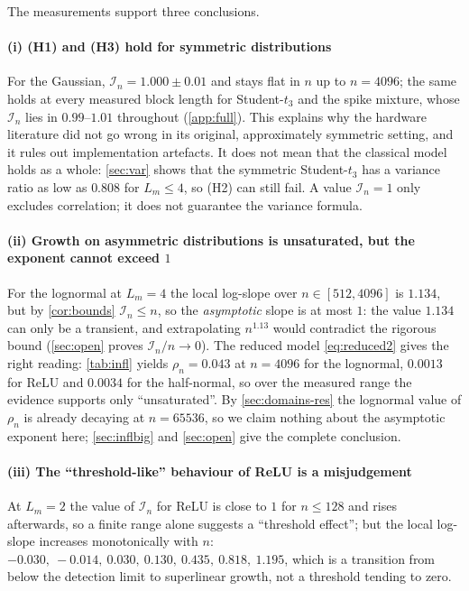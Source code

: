 \documentclass[twocolumn,review,hidelinks,oneeqnum,onetabnum,onefignum,onethmnum]{siamart251216}
\begin{document}
The measurements support three conclusions.

\paragraph{(i) (H1) and (H3) hold for symmetric distributions} For the Gaussian,
$\mathcal I_n=1.000\pm0.01$ and stays flat in $n$ up to $n=4096$; the same holds at
every measured block length for Student-$t_3$ and the spike mixture, whose
$\mathcal I_n$ lies in $0.99$--$1.01$ throughout (\cref{app:full}).
This explains why the hardware literature did not go wrong in its original,
approximately symmetric setting, and it rules out implementation artefacts. It
does not mean that the classical model holds as a whole: \cref{sec:var} shows that
the symmetric Student-$t_3$ has a variance ratio as low as $0.808$ for
$L_m\le4$, so (H2) can still fail. A value $\mathcal I_n=1$ only excludes
correlation; it does not guarantee the variance formula.

\paragraph{(ii) Growth on asymmetric distributions is unsaturated, but the
exponent cannot exceed $1$} For the lognormal at $L_m=4$ the local log-slope over
$n\in[512,4096]$ is $1.134$, but by \cref{cor:bounds} $\mathcal I_n\le n$, so the
\emph{asymptotic} slope is at most $1$: the value $1.134$ can only be a transient,
and extrapolating $n^{1.13}$ would contradict the rigorous bound
(\cref{sec:open} proves $\mathcal I_n/n\to0$). The reduced model \cref{eq:reduced2}
gives the right reading: \cref{tab:infl} yields $\rho_n=0.043$ at $n=4096$ for the
lognormal, $0.0013$ for ReLU and $0.0034$ for the half-normal, so over the measured
range the evidence supports only ``unsaturated''. By \cref{sec:domains-res} the
lognormal value of $\rho_n$ is already decaying at $n=65536$, so we claim nothing
about the asymptotic exponent here; \cref{sec:inflbig} and \cref{sec:open} give the
complete conclusion.

\paragraph{(iii) The ``threshold-like'' behaviour of ReLU is a misjudgement} At
$L_m=2$ the value of $\mathcal I_n$ for ReLU is close to $1$ for $n\le128$ and
rises afterwards, so a finite range alone suggests a ``threshold effect''; but the
local log-slope increases monotonically with $n$:
$-0.030,\ -0.014,\ 0.030,\ 0.130,\ 0.435,\ 0.818,\ \mathbf{1.195}$, which is a
transition from below the detection limit to superlinear growth, not a threshold
tending to zero.
\end{document}

